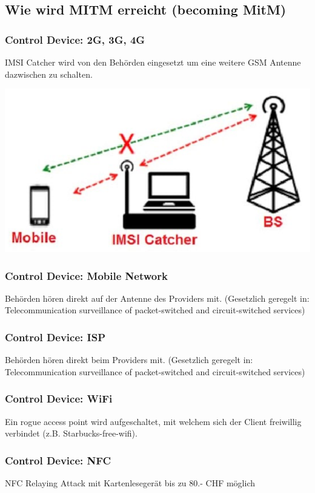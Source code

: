 \subsection{Wie wird MITM erreicht (becoming MitM)}

\subsubsection{Control Device: 2G, 3G, 4G}
IMSI Catcher wird von den Behörden eingesetzt um eine weitere GSM Antenne dazwischen zu schalten.
\begin{center}
    \vspace{-8pt}
    \includegraphics[width=.6\linewidth]{./img/09-mitm/imsi}
    \vspace{-8pt}
\end{center}

\subsubsection{Control Device: Mobile Network}
Behörden hören direkt auf der Antenne des Providers mit. (Gesetzlich geregelt in: Telecommunication surveillance of packet-switched and circuit-switched services)

\subsubsection{Control Device: ISP}
Behörden hören direkt beim Providers mit. (Gesetzlich geregelt in: Telecommunication surveillance of packet-switched and circuit-switched services)

\subsubsection{Control Device: WiFi}
Ein rogue access point wird aufgeschaltet, mit welchem sich der Client freiwillig verbindet (z.B. Starbucks-free-wifi).

\subsubsection{Control Device: NFC}
NFC Relaying Attack mit Kartenlesegerät bis zu 80.- CHF möglich

